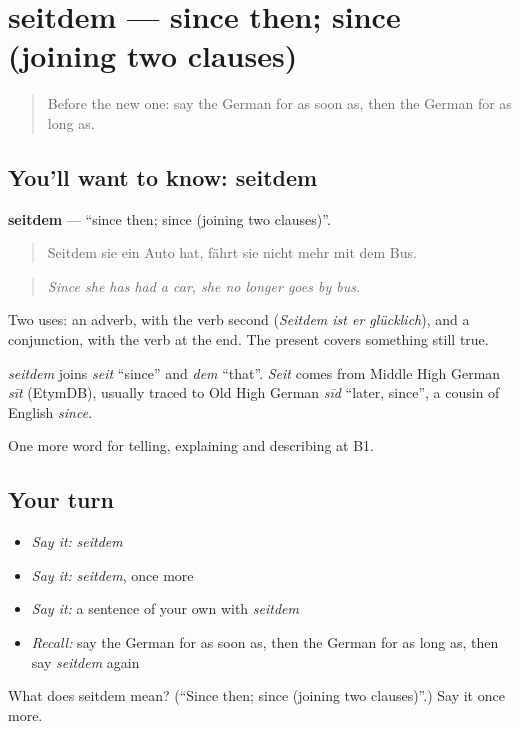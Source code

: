 \section[seitdem]{seitdem — since then; since (joining two clauses)}

\label{lesson:GE-C263-seitdem}



\begin{quote}
Before the new one: say the German for as soon as, then the German for as long as.
\end{quote}

\subsection*{You'll want to know: seitdem}
\textbf{seitdem} — \textquotedblleft{}since then; since (joining two clauses)\textquotedblright{}.

\begin{quote}
Seitdem sie ein Auto hat, fährt sie nicht mehr mit dem Bus.
\end{quote}

\begin{quote}
\emph{Since she has had a car, she no longer goes by bus.}
\end{quote}

Two uses: an adverb, with the verb second (\emph{Seitdem ist er glücklich}), and a conjunction, with the verb at the end. The present covers something still true.

\begin{cousinweb}
\emph{seitdem} joins \emph{seit} \textquotedblleft{}since\textquotedblright{} and \emph{dem} \textquotedblleft{}that\textquotedblright{}. \emph{Seit} comes from Middle High German \emph{sīt} (EtymDB), usually traced to Old High German \emph{sīd} \textquotedblleft{}later, since\textquotedblright{}, a cousin of English \emph{since}.
\end{cousinweb}

\begin{grammarlens}[title={What you've built}]
One more word for telling, explaining and describing at B1.
\end{grammarlens}

\subsection*{Your turn}
\begin{itemize}
\raggedright
  \item \emph{Say it:} \emph{seitdem}
  \item \emph{Say it:} \emph{seitdem}, once more
  \item \emph{Say it:} a sentence of your own with \emph{seitdem}
  \item \emph{Recall:} say the German for as soon as, then the German for as long as, then say \emph{seitdem} again
\end{itemize}

\begin{tcolorbox}[breakable,colback=teal!4,colframe=teal!35!black,title={Before you move on}]
What does seitdem mean? (\textquotedblleft{}Since then; since (joining two clauses)\textquotedblright{}.) Say it once more.
\end{tcolorbox}
